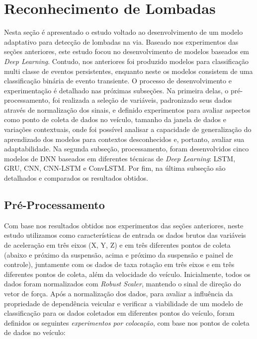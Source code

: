 \chapter{Reconhecimento de Lombadas}
\label{cap:deteccao_lombadas}

Nesta seção é apresentado o estudo voltado ao desenvolvimento de um modelo adaptativo para detecção de lombadas na via. Baseado nos experimentos das seções anteriores, este estudo focou no desenvolvimento de modelos baseados em \textit{Deep Learning}. Contudo, nos anteriores foi produzido modelos para classificação multi classe de eventos persistentes, enquanto neste os modelos consistem de uma classificação binária de evento transiente. O processo de desenvolvimento e experimentação é detalhado nas próximas subseções. Na primeira delas, o pré-processamento, foi realizada a seleção de variáveis, padronizado seus dados através de normalização dos sinais, e definido experimentos para avaliar aspectos como ponto de coleta de dados no veículo, tamanho da janela de dados e variações contextuais, onde foi possível analisar a capacidade de generalização do aprendizado dos modelos para contextos desconhecidos e, portanto, avaliar sua adaptabilidade. Na segunda subseção, processamento, foram desenvolvidos cinco modelos de DNN baseados em diferentes técnicas de \textit{Deep Learning}: LSTM, GRU, CNN, CNN-LSTM e ConvLSTM. Por fim, na última subseção são detalhados e comparados os resultados obtidos.

\section{Pré-Processamento}

Com base nos resultados obtidos nos experimentos das seções anteriores, neste estudo utilizamos como características de entrada os dados brutos das variáveis de aceleração em três eixos (X, Y, Z) e em três diferentes pontos de coleta (abaixo e próximo da suspensão, acima e próximo da suspensão e painel de controle), juntamente com os dados de taxa rotação em três eixos e em três diferentes pontos de coleta, além da velocidade do veículo. Inicialmente, todos os dados foram normalizados com \textit{Robust Scaler}, mantendo o sinal de direção do vetor de força. Após a normalização dos dados, para avaliar a influência da propriedade de dependência veicular e verificar a viabilidade de um modelo de classificação para os dados coletados em diferentes pontos do veículo, foram definidos os seguintes \emph{experimentos por colocação}, com base nos pontos de coleta de dados no veículo:

